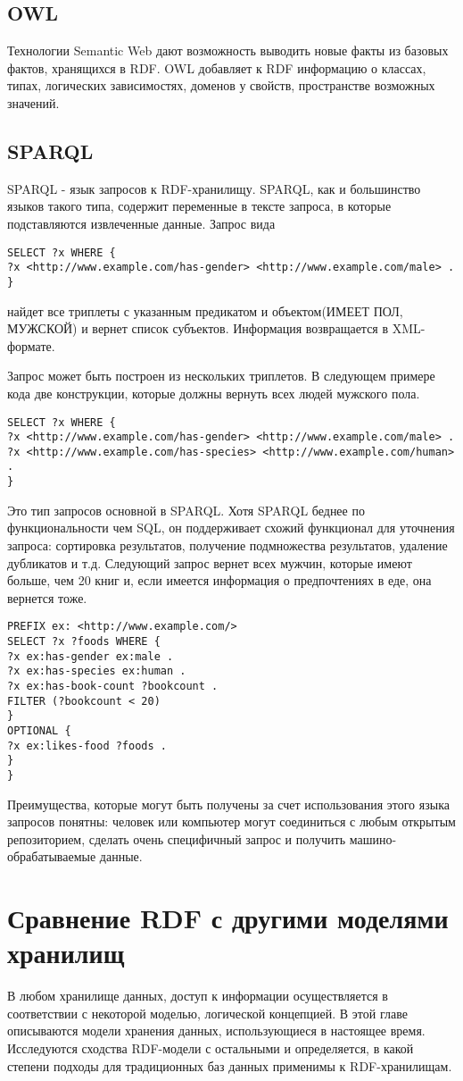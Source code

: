 \documentclass[specialist,subf,href,colorlinks=true
]{disser}
\begin{document}
\section{OWL}
Технологии Semantic Web дают возможность выводить новые факты из базовых фактов, хранящихся в RDF. OWL добавляет к RDF информацию о классах, типах, логических зависимостях, доменов у свойств, пространстве возможных значений. 
\section{SPARQL}
SPARQL - язык запросов к RDF-хранилищу. SPARQL, как и большинство языков такого типа, содержит переменные в тексте запроса, в которые подставляются извлеченные данные.
Запрос вида
\begin{lstlisting}
SELECT ?x WHERE {
?x <http://www.example.com/has-gender> <http://www.example.com/male> . 
}
\end{lstlisting}
найдет все триплеты с указанным предикатом и объектом(ИМЕЕТ ПОЛ, МУЖСКОЙ) и вернет список субъектов. Информация возвращается в XML-формате.

Запрос может быть построен из нескольких триплетов. В следующем примере кода две конструкции, которые должны вернуть всех людей мужского пола.
\begin{lstlisting}
SELECT ?x WHERE {
?x <http://www.example.com/has-gender> <http://www.example.com/male> .
?x <http://www.example.com/has-species> <http://www.example.com/human> .
}
\end{lstlisting}
Это тип запросов основной в SPARQL. Хотя SPARQL беднее по функциональности чем SQL, он поддерживает схожий функционал для уточнения запроса: сортировка результатов, получение подмножества результатов, удаление дубликатов и т.д.
Следующий запрос вернет всех мужчин, которые имеют больше, чем 20 книг и, если имеется информация о предпочтениях в еде, она вернется тоже.
\begin{lstlisting}
PREFIX ex: <http://www.example.com/>
SELECT ?x ?foods WHERE {
?x ex:has-gender ex:male .
?x ex:has-species ex:human .
?x ex:has-book-count ?bookcount .
FILTER (?bookcount < 20)
}
OPTIONAL {
?x ex:likes-food ?foods .
}
}
\end{lstlisting}
Преимущества, которые могут быть получены за счет использования этого языка запросов понятны: человек или компьютер могут соединиться с любым открытым репозиторием, сделать очень специфичный запрос и получить машино-обрабатываемые данные.
\chapter{Сравнение RDF с другими моделями хранилищ}
В любом хранилище данных, доступ к информации осуществляется в соответствии с некоторой моделью, логической концепцией. В этой главе описываются модели хранения данных, использующиеся в настоящее время. Исследуются сходства RDF-модели с остальными и определяется, в какой степени подходы для традиционных баз данных применимы к RDF-хранилищам.
\end{document}
